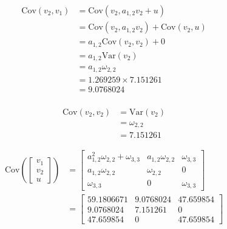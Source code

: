\documentclass[
]{book}
\begin{document}
\begin{equation}
  \begin{split}
    \mathrm{Cov} \left( v_2, v_1 \right)
    &=
    \mathrm{Cov} \left( v_2, a_{1, 2} v_2 + u \right) \\
    &=
    \mathrm{Cov} \left( v_2, a_{1, 2} v_2 \right)
    +
    \mathrm{Cov} \left( v_2, u \right) \\
    &=
    a_{1, 2} \mathrm{Cov} \left( v_2, v_2 \right)
    +
    0 \\
    &=
    a_{1, 2} \mathrm{Var} \left( v_2 \right) \\
    &=
    a_{1, 2} \omega_{2, 2} \\
    &=
    1.269259 \times 7.151261 \\ 
    &=
    9.0768024 \\ 
  \end{split}
\end{equation}

\begin{equation}
  \begin{split}
    \mathrm{Cov} \left( v_2, v_2 \right)
    &=
    \mathrm{Var} \left( v_2 \right) \\
    &=
    \omega_{2, 2} \\
    &=
    7.151261
  \end{split}
\end{equation}

\begin{equation}
  \begin{split}
    \mathrm{Cov}
    \left(
      \begin{bmatrix}
        v_1 \\
        v_2 \\
        u
      \end{bmatrix}
    \right)
    &=
    \begin{bmatrix}
      a_{1, 2}^{2} \omega_{2, 2} + \omega_{3, 3} & a_{1, 2} \omega_{2, 2} & \omega_{3, 3} \\
      a_{1, 2} \omega_{2, 2} & \omega_{2, 2} & 0 \\
      \omega_{3, 3} & 0 & \omega_{3, 3}
    \end{bmatrix} \\
    &=
    \begin{bmatrix}
      59.1806671 & 9.0768024 & 47.659854 \\
      9.0768024 & 7.151261 & 0 \\
      47.659854 & 0 & 47.659854
    \end{bmatrix}
  \end{split}
\end{equation}
\end{document}
